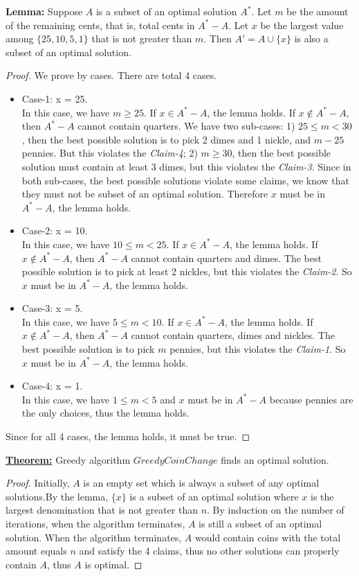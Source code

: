 \documentclass[11pt]{article}
\begin{document}
\begin{enumerate}
\begin{enumerate}
\textbf{Lemma:} Suppose $A$ is a subset of an optimal solution $A^*$.
Let $m$ be the amount of the remaining cents, that is, total cents in $A^*-A$.
Let $x$ be the largest value among $\{25,10,5,1\}$ that is not greater
than $m$. Then $A' = A \cup \{x\}$ is also a subset of an optimal solution.

\begin{proof}
  We prove by cases. There are total 4 cases.
\begin{itemize}
\item Case-1: x = 25.\\
  In this case, we have $m \geq 25$. If $x \in A^*-A$, the lemma
  holds. If $x \notin A^*-A$, then $A^*-A$ cannot contain quarters. We
  have two sub-cases: 1) $25 \leq m < 30$, then the best possible solution is to
  pick 2 dimes and 1 nickle, and $m-25$ pennies. But this violates the
  \emph{Claim-4}; 2) $m \geq 30$, then the best possible solution must contain at
  least 3 dimes, but this violates the \emph{Claim-3}. Since in both
  sub-cases, the best possible solutions violate some claims, we know
  that they must not be subset of an optimal solution. Therefore $x$
  must be in $A^*-A$, the lemma holds.
\item Case-2: x = 10.\\
  In this case, we have $10 \leq m < 25$. If $x \in A^*-A$, the lemma
  holds. If $x \notin A^*-A$, then $A^*-A$ cannot contain quarters and
  dimes. The best possible solution is to pick at least 2 nickles, but
  this violates the \emph{Claim-2}. So $x$ must be in $A^*-A$, the
  lemma holds. 
\item Case-3: x = 5.\\
  In this case, we have $5 \leq m < 10$. If $x \in A^*-A$, the lemma
  holds. If $x \notin A^*-A$, then $A^*-A$ cannot contain quarters,
  dimes and nickles. The best possible solution is to pick $m$
  pennies, but this violates the \emph{Claim-1}. So $x$ must be in
  $A^*-A$, the lemma holds.
\item Case-4: x = 1.\\
  In this case, we have $1 \leq m < 5$ and $x$ must be in
  $A^*-A$ because pennies are the only choices, thus the lemma holds.
\end{itemize}
Since for all 4 cases, the lemma holds, it must be true.
\end{proof}

\underline{\textbf{Theorem:}} Greedy algorithm $GreedyCoinChange$
finds an optimal solution.

\begin{proof}
  Initially, $A$ is an empty set which is always a subset of any
  optimal solutions.By the lemma, $\{x\}$ is a subset of an optimal
  solution where $x$ is the largest denomination that is not greater
  than $n$. By induction on the number of iterations, when 
  the algorithm terminates, $A$ is still a subset of an optimal
  solution. When the algorithm terminates, $A$ would contain coins
  with the total amount equals $n$ and satisfy the 4 claims, thus no
  other solutions can properly contain $A$, thus $A$ is optimal.
\end{proof}


\end{enumerate}
\end{enumerate}
\end{document}
